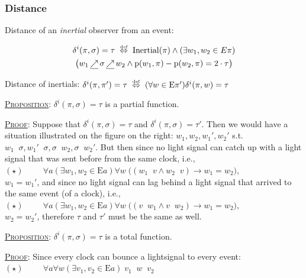\documentclass[xcolor=x11names]{beamer}
\newcommand{\dzsa}[1]{\textsc{\underline{#1}}:}
\newcommand{\llfutureeq}{\mathop{\underline\nearrow}}
\newcommand{\defekv}[1][.1]{\hspace{#1cm}\overset{\textup{\tiny def}}{ \Leftrightarrow }\hspace{#1cm}}
\newcommand{\lthen}{\rightarrow}
\newcommand{\forallin}[2]{(\forall #1 \in #2)}
\newcommand{\existsin}[2]{(\exists #1 \in #2)}
\newcommand{\Pointsf}{\mathrm{p}}
\newcommand{\Ex}{\mathrm{E}}
\begin{document}
\begin{frame}[t]
\frametitle{Distance}
\footnotesize
Distance of an \emph{inertial} observer from an event:

\medskip
\begin{minipage}{.82\textwidth}
\begin{multline*}
\delta^i(\pi, \sigma) = \tau \defekv  \mathrm{Inertial}(\pi) \land \existsin {w_1,w_2}{E\pi} \\ \big(w_1\llfutureeq \sigma \llfutureeq w_2\land  \Pointsf (w_1,\pi)-\Pointsf (w_2,\pi)=2\cdot \tau\big)
\end{multline*}
\end{minipage}
\medskip

Distance of inertials: $\delta^i(\pi, \pi') = \tau \defekv \forallin w{\Ex \pi'} \delta^i(\pi, w) = \tau$


\dzsa{Proposition} $\delta^i(\pi, \sigma)= \tau$ is a partial function.

{\tiny
\begin{minipage}{8.5cm}
\dzsa{Proof} Suppose that $\delta^i(\pi, \sigma)= \tau$ and $\delta^i(\pi, \sigma)= \tau'$. Then we would have a situation illustrated on the figure on the right: $w_1, w_2, w_1', w_2'$ s.t. $w_1\llfutureeq \sigma, w_1'\llfutureeq \sigma, \sigma \llfutureeq w_2, \sigma \llfutureeq w_2'$. But then since no light signal can catch up with a light signal that was sent before from the same clock, i.e.,
\\ $(\star)\hspace{1cm} \forall a \existsin {w_1, w_2}{\Ex a} \forall w \;\big((w_1\llfutureeq v \land w_2\llfutureeq v) \lthen w_1=w_2\big)$,
\\ $w_1 = w_1'$, and
since no light signal can lag behind a light signal that arrived to the same event (of a clock), i.e.,
\\ $(\star)\hspace{1cm} \forall a \existsin {w_1, w_2}{\Ex a} \forall w \;\big((v\llfutureeq w_1 \land v\llfutureeq w_2) \lthen w_1=w_2\big)$,
\\ $w_2=w_2'$, therefore $\tau$ and $\tau'$ must be the same as well.
\end{minipage}}

\dzsa{Proposition} $\delta^i(\pi, \sigma)= \tau$ is a total function.

{\tiny \dzsa{Proof} Since every clock can bounce a lightsignal to every event:
\\ $(\star)\hspace{1cm} \forall a \forall w \existsin {v_1, v_2}{\Ex a} \;v_1\llfutureeq w\llfutureeq v_2$}


\end{frame}
\end{document}

